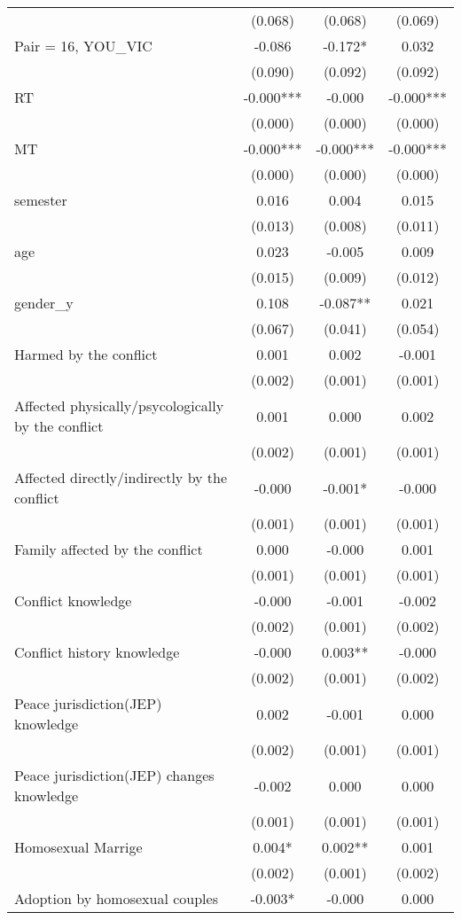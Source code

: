 \documentclass[]{article}
\begin{document}
\begin{tabular}{lccc}
 & (0.068) & (0.068) & (0.069) \\
Pair = 16, YOU\_VIC & -0.086 & -0.172* & 0.032 \\
 & (0.090) & (0.092) & (0.092) \\
RT & -0.000*** & -0.000 & -0.000*** \\
 & (0.000) & (0.000) & (0.000) \\
MT & -0.000*** & -0.000*** & -0.000*** \\
 & (0.000) & (0.000) & (0.000) \\
semester & 0.016 & 0.004 & 0.015 \\
 & (0.013) & (0.008) & (0.011) \\
age & 0.023 & -0.005 & 0.009 \\
 & (0.015) & (0.009) & (0.012) \\
gender\_y & 0.108 & -0.087** & 0.021 \\
 & (0.067) & (0.041) & (0.054) \\
Harmed by the conflict & 0.001 & 0.002 & -0.001 \\
 & (0.002) & (0.001) & (0.001) \\
Affected physically/psycologically by the conflict & 0.001 & 0.000 & 0.002 \\
 & (0.002) & (0.001) & (0.001) \\
Affected directly/indirectly by the conflict & -0.000 & -0.001* & -0.000 \\
 & (0.001) & (0.001) & (0.001) \\
Family affected by the conflict & 0.000 & -0.000 & 0.001 \\
 & (0.001) & (0.001) & (0.001) \\
Conflict knowledge & -0.000 & -0.001 & -0.002 \\
 & (0.002) & (0.001) & (0.002) \\
Conflict history knowledge & -0.000 & 0.003** & -0.000 \\
 & (0.002) & (0.001) & (0.002) \\
Peace jurisdiction(JEP) knowledge & 0.002 & -0.001 & 0.000 \\
 & (0.002) & (0.001) & (0.001) \\
Peace jurisdiction(JEP) changes knowledge & -0.002 & 0.000 & 0.000 \\
 & (0.001) & (0.001) & (0.001) \\
Homosexual Marrige & 0.004* & 0.002** & 0.001 \\
 & (0.002) & (0.001) & (0.002) \\
Adoption by homosexual couples & -0.003* & -0.000 & 0.000 \\

\end{tabular}
\end{document}
